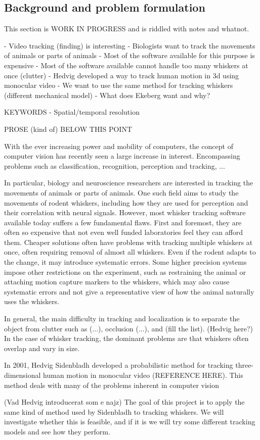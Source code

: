 \subsection{Background and problem formulation}
This section is WORK IN PROGRESS and is riddled with notes and whatnot.

- Video tracking (finding) is interesting
- Biologists want to track the movements of animals or parts of animals
- Most of the software available for this purpose is expensive
- Most of the software available cannot handle too many whiskers at once (clutter)
- Hedvig developed a way to track human motion in 3d using monocular video
- We want to use the same method for tracking whiskers (different mechanical model)
- What does Ekeberg want and why?

KEYWORDS
- Spatial/temporal resolution


PROSE (kind of) BELOW THIS POINT


With the ever increasing power and mobility of computers, the concept of computer vision has recently seen a large increase in interest. Encompassing problems such as classification, recognition, perception and tracking, ...

In particular, biology and neuroscience researchers are interested in tracking the movements of animals or parts of animals. One such field aims to study the movements of rodent whiskers, including how they are used for perception and their correlation with neural signals. However, most whisker tracking software available today suffers a few fundamental flaws. First and foremost, they are often so expensive that not even well funded laboratories feel they can afford them. Cheaper solutions often have problems with tracking multiple whiskers at once, often requiring removal of almost all whiskers. Even if the rodent adapts to the change, it may introduce systematic errors. Some higher precision systems impose other restrictions on the experiment, such as restraining the animal or attaching motion capture markers to the whiskers, which may also cause systematic errors and not give a representative view of how the animal naturally uses the whiskers.

In general, the main difficulty in tracking and localization is to separate the object from clutter such as (...), occlusion (...), and (fill the list). (Hedvig here?) In the case of whisker tracking, the dominant problems are that whiskers often overlap and vary in size.

In 2001, Hedvig Sidenbladh developed a probabilistic method for tracking three-dimensional human motion in monocular video (REFERENCE HERE). This method deals with many of the problems inherent in computer vision

(Vad Hedvig introducerat som e najz) The goal of this project is to apply the same kind of method used by Sidenbladh to tracking whiskers. We will investigate whether this is feasible, and if it is we will try some different tracking models and see how they perform.

